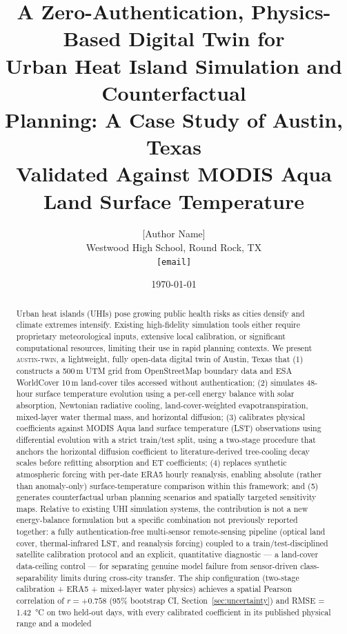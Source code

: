 \documentclass[12pt, letterpaper]{article}
\title{
    \textbf{A Zero-Authentication, Physics-Based Digital Twin for\\
    Urban Heat Island Simulation and Counterfactual\\
    Planning: A Case Study of Austin, Texas}\\[0.5em]
    \large Validated Against MODIS Aqua Land Surface Temperature
}
\author{
    [Author Name]\\
    \small Westwood High School, Round Rock, TX\\
    \small \texttt{[email]}
}
\date{\today}
\begin{document}
\maketitle
\thispagestyle{empty}

\begin{abstract}
Urban heat islands (UHIs) pose growing public health risks as cities densify
and climate extremes intensify. Existing high-fidelity simulation tools either
require proprietary meteorological inputs, extensive local calibration, or
significant computational resources, limiting their use in rapid planning
contexts. We present \textsc{austin-twin}, a lightweight, fully open-data
digital twin of Austin, Texas that (1) constructs a 500\,m UTM grid from
OpenStreetMap boundary data and ESA WorldCover 10\,m land-cover tiles accessed
without authentication; (2) simulates 48-hour surface temperature evolution
using a per-cell energy balance with solar absorption, Newtonian radiative
cooling, land-cover-weighted evapotranspiration, mixed-layer water thermal mass,
and horizontal diffusion; (3) calibrates physical coefficients against MODIS
Aqua land surface temperature (LST) observations using differential evolution
with a strict train/test split, using a two-stage procedure that anchors the
horizontal diffusion coefficient to literature-derived tree-cooling decay
scales before refitting absorption and ET coefficients; (4) replaces synthetic
atmospheric forcing with per-date ERA5 hourly reanalysis, enabling absolute
(rather than anomaly-only) surface-temperature comparison within this
framework; and (5) generates counterfactual urban planning scenarios and
spatially targeted sensitivity maps. Relative to existing UHI simulation
systems, the contribution is not a new energy-balance formulation but a
specific combination not previously reported together: a fully
authentication-free multi-sensor remote-sensing pipeline (optical land
cover, thermal-infrared LST, and reanalysis forcing) coupled to a
train/test-disciplined satellite calibration protocol and an explicit,
quantitative diagnostic — a land-cover data-ceiling control — for
separating genuine model failure from sensor-driven class-separability
limits during cross-city transfer. The ship configuration (two-stage
calibration + ERA5 + mixed-layer water physics) achieves a spatial Pearson
correlation of $r = +0.758$ (95\% bootstrap CI, Section~\ref{sec:uncertainty})
and RMSE = \SI{1.42}{\degreeCelsius} on two held-out days, with every
calibrated coefficient in its published physical range and a modeled

\end{abstract}
\end{document}
